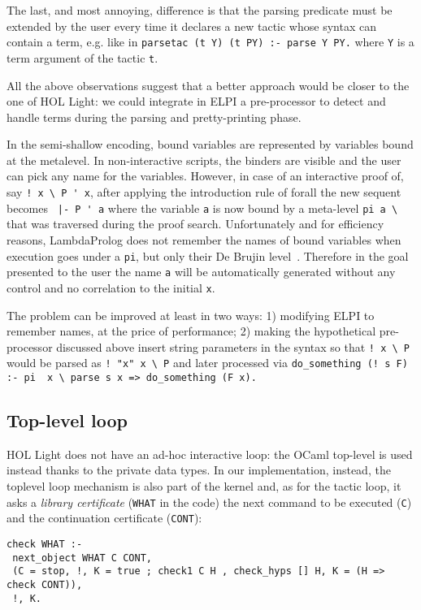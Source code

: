 \documentclass[preprint]{sigplanconf}
\begin{document}
The last, and most annoying, difference is that the parsing predicate must be extended by the user every time it declares a new tactic whose syntax can contain a term, e.g. like in \texttt{parsetac (t Y) (t PY) :- parse Y PY.} where \verb+Y+ is a term argument of the tactic \verb+t+.

All the above observations suggest that a better approach would be closer to the one of HOL Light: we could integrate in ELPI a pre-processor to detect and handle terms during the parsing and pretty-printing phase.

In the semi-shallow encoding, bound variables are represented by variables bound at the metalevel. In non-interactive scripts, the binders are visible and the user can pick any name for the variables. However, in case of an interactive proof of, say \verb+! x \ P ' x+, after applying the introduction rule of forall the new sequent becomes \verb+ |- P ' a+ where the variable \verb+a+ is now bound by a meta-level \verb+pi a \ + that was traversed during the proof search. Unfortunately and for efficiency reasons, LambdaProlog does not remember the names of bound variables when execution goes under a \verb+pi+, but only their De Brujin level~\cite{???}. Therefore in the goal presented to the user the name \verb+a+ will be automatically generated without any control and no correlation to the initial \verb+x+.

The problem can be improved at least in two ways: 1) modifying ELPI to remember names, at the price of performance; 2) making the hypothetical pre-processor discussed above insert string parameters in the syntax so that \verb+! x \ P+ would be parsed as \verb+! "x" x \ P+ and later processed via \verb+do_something (! s F) :- pi  x \ parse s x => do_something (F x).+

\subsection{Top-level loop}

HOL Light does not have an ad-hoc interactive loop: the OCaml top-level is used instead thanks to the private data types. In our implementation, instead, the toplevel loop mechanism is also part of the kernel and, as for the tactic loop, it asks a \emph{library certificate} (\verb+WHAT+ in the code) the next command to be executed
(\verb+C+) and the continuation certificate (\verb+CONT+):

\begin{verbatim}
check WHAT :-
 next_object WHAT C CONT,
 (C = stop, !, K = true ; check1 C H , check_hyps [] H, K = (H => check CONT)),
 !, K.
\end{verbatim}
\end{document}
